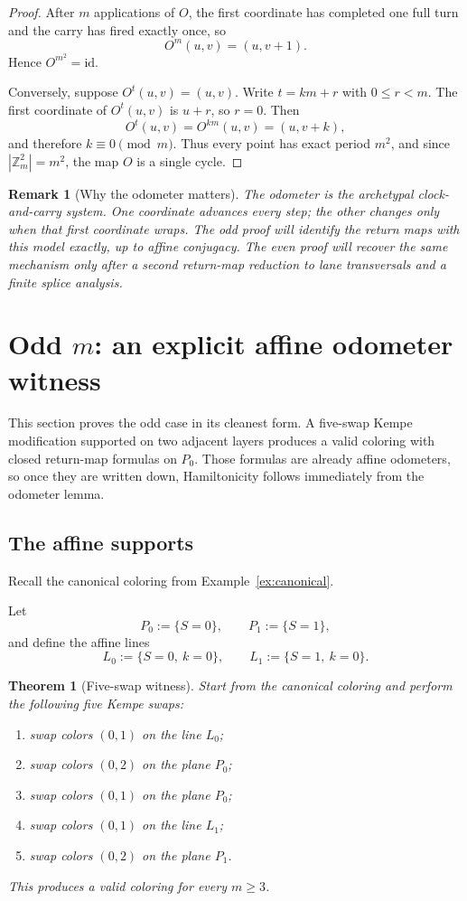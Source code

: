 \documentclass[11pt]{article}
\newtheorem{theorem}{Theorem}
\newtheorem{remark}{Remark}
\newcommand{\Zm}{\mathbb Z_m}
\begin{document}
\begin{proof}
After $m$ applications of $O$, the first coordinate has completed one full turn and the carry has fired exactly once, so
\[
O^m(u,v)=(u,v+1).
\]
Hence $O^{m^2}=\mathrm{id}$.

Conversely, suppose $O^t(u,v)=(u,v)$.
Write $t=km+r$ with $0\le r<m$.
The first coordinate of $O^t(u,v)$ is $u+r$, so $r=0$.
Then
\[
O^t(u,v)=O^{km}(u,v)=(u,v+k),
\]
and therefore $k\equiv 0\pmod m$.
Thus every point has exact period $m^2$, and since $|\Zm^2|=m^2$, the map $O$ is a single cycle.
\end{proof}

\begin{remark}[Why the odometer matters]
The odometer is the archetypal clock-and-carry system.
One coordinate advances every step; the other changes only when that first coordinate wraps.
The odd proof will identify the return maps with this model exactly, up to affine conjugacy.
The even proof will recover the same mechanism only after a second return-map reduction to lane transversals and a finite splice analysis.
\end{remark}


\section{Odd $m$: an explicit affine odometer witness}\label{sec:affine}

This section proves the odd case in its cleanest form.
A five-swap Kempe modification supported on two adjacent layers produces a valid coloring with closed return-map formulas on $P_0$.
Those formulas are already affine odometers, so once they are written down, Hamiltonicity follows immediately from the odometer lemma.

\subsection{The affine supports}
Recall the canonical coloring from Example~\ref{ex:canonical}.

Let
\[
P_0:=\{S=0\},\qquad P_1:=\{S=1\},
\]
and define the affine lines
\[
L_0:=\{S=0,\ k=0\},\qquad L_1:=\{S=1,\ k=0\}.
\]

\begin{theorem}[Five-swap witness]\label{thm:5swap}
Start from the canonical coloring and perform the following five Kempe swaps:
\begin{enumerate}[leftmargin=2.2em]
\item swap colors $(0,1)$ on the line $L_0$;
\item swap colors $(0,2)$ on the plane $P_0$;
\item swap colors $(0,1)$ on the plane $P_0$;
\item swap colors $(0,1)$ on the line $L_1$;
\item swap colors $(0,2)$ on the plane $P_1$.
\end{enumerate}
This produces a valid coloring for every $m\ge 3$.
\end{theorem}
\end{document}
